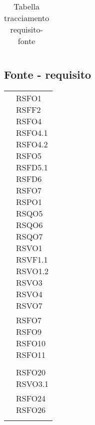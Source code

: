 {{{{{\begin{center}
\begin{longtable}{|p{7.5cm}|p{7.5cm}|}
		\caption[Tabella tracciamento requisito-fonte]{Tabella tracciamento requisito-fonte}\label{4.5}\\
	\end{longtable}
\end{center}
\clearpage
\subsection{Fonte - requisito}\label{RequisitiTracciamentoDeiRequisitiFonteRequisito}
\def\tabularxcolumn#1{m{#1}}
{
	\begin{center}
		\renewcommand{\arraystretch}{1.4}
		\begin{longtable}{|p{7.5cm}|p{7.5cm}|}
		\hline
		\rowcolor{airforceblue}
		\makecell[c]{\textbf{Fonte}} & \makecell[c]{\textbf{Codice RS}}  \\
		\hline
		\makecell[c]{Capitolato$_{\scaleto{G}{3pt}}$} & \makecell[c]{RSFO1\\RSFF2\\RSFO4\\RSFO4.1\\RSFO4.2\\RSFO5\\RSFD5.1\\RSFD6\\RSFO7\\RSPO1\\RSQO5\\RSQO6\\RSQO7\\RSVO1\\RSVF1.1\\RSVO1.2\\RSVO3\\RSVO4\\RSVO7} \\
		\hline
		\makecell[c]{UC1} & \makecell[c]{RSFO7 \\ RSFO9 \\ RSFO10 \\ RSFO11} \\
		\hline
		\makecell[c]{UC2} & \makecell[c]{RSFO3} \\
		\hline
		\makecell[c]{UC3} & \makecell[c]{RSFO20 \\ RSVO3.1 } \\ %
		\hline
		\makecell[c]{UC4.1} & \makecell[c]{RSFO24 \\ RSFO26} \\
		\hline
		\makecell[c]{UC4.2} & \makecell[c]{RSFO27} \\

\end{longtable}
\end{center}}}}}}}
